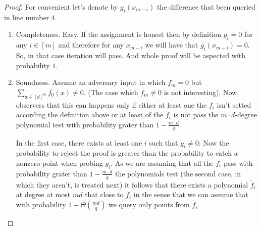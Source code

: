 \documentclass{article}
\begin{document}
\begin{proof} For convenient let's denote by $g_{i}\left( x_{m-i} \right)$ the difference that been queried in line number $4$. 
  \begin{enumerate}
    \item Completeness. Easy. If the assignment is honest then by definition $g_{i} = 0$ for any $i \in [m]$ and therefore for any $x_{m-i}$ we will have that $g_{i} \left( x_{m-i} \right) = 0$. So, in that case iteration will pass. And whole proof will be aspected  with probability $1$.  
    \item Soundness. Assume an adversary input in which $f_{m} = 0$ but $\sum_{\mathbf{x} \in [d]^{m}}{f_{0}(x)}\neq 0$. (The case which $f_{m} \neq 0$ is not interesting). Now, observers that this can happens only if either at least one the $f_{i}$ isn't setted according the definition above or at least of the $f_{i}$ is not pass the $m\cdot d$-degree polynomial test with probability grater than $1 - \frac{m\cdot d}{q}$. 

      In the first case, there exists at least one $i$ such that $g_{i}\neq 0$:
      Now the probability to reject the proof is greater than the probability to catch a nonzero point when probing $g_{i}$. As we are assuming that all the $f_{i}$ pass with probability grater than $1 - \frac{m\cdot d}{q}$ the polynomials test (the second case, in which they aren't, is treated next) it follows that there exists a polynomial $\tilde{f}_{i}$ at degree at most $md$ that close to $f_{i}$ in the sense that we can assume that with probability $1 - \Theta(\frac{md}{q})$ we query only points from $\tilde{f}_{i}$. 


\end{enumerate}
\end{proof}
\end{document}
